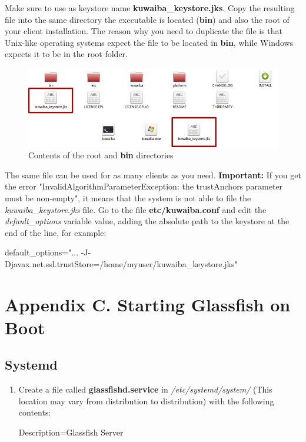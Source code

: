 \documentclass[a4paper]{article}
\begin{document}
\begin{appendices}
\begin{enumerate}
					Make sure to use as keystore name \textbf{kuwaiba\_keystore.jks}. Copy the resulting file into the same directory the executable is located (\textbf{bin}) and also the root of your client installation. The reason why you need to duplicate the file is that Unix-like operating systems expect the file to be located in \textbf{bin}, while Windows expects it to be in the root folder.\\
					
					\begin{figure}[h!]
						\centering
						\includegraphics[width=0.5\linewidth]{img/etc_contents.png} 	
						\caption{Contents of the root and \textbf{bin} directories}
						\label{fig:etc-contents}
					\end{figure}
					The same file can be used for as many clients as you need. \textbf{Important:} If you get the error "InvalidAlgorithmParameterException: the trustAnchors parameter must be non-empty", it means that the system is not able to file the \textit{kuwaiba\_keystore.jks} file. Go to the file \textbf{etc/kuwaiba.conf} and edit the \textit{default\_options} variable value, adding the absolute path to the keystore at the end of the line, for example:
					\begin{verbbox}
						default_options="... -J-Djavax.net.ssl.trustStore=/home/myuser/kuwaiba_keystore.jks"
					\end{verbbox}
					\begin{figure}[ht]
						\centering	
						\theverbbox
					\end{figure}
				\end{enumerate}
		    \clearpage
			\section{Appendix C. Starting Glassfish on Boot} \label{app:AppendixC}
				\subsection{Systemd}
				\begin{enumerate}
					\item Create a file called \textbf{glassfishd.service} in \textit{/etc/systemd/system/} (This location may vary from distribution to distribution) with the following contents:
					\begin{verbbox}
						[Unit]
						Description=Glassfish Server
						

\end{verbbox}
\end{enumerate}
\end{appendices}
\end{document}
